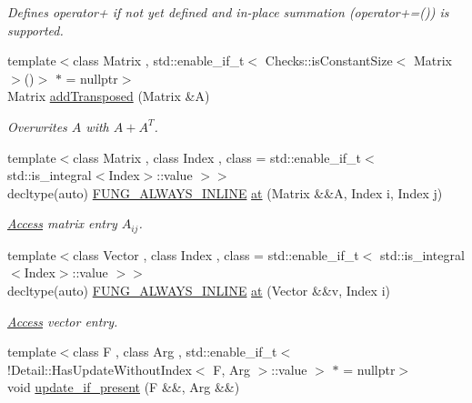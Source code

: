 \begin{DoxyCompactItemize}
\begin{DoxyCompactList}\small\item\em Defines operator+ if not yet defined and in-\/place summation (operator+=()) is supported. \end{DoxyCompactList}\item 
{\footnotesize template$<$class Matrix , std\+::enable\+\_\+if\+\_\+t$<$ Checks\+::is\+Constant\+Size$<$ Matrix $>$()$>$ $\ast$  = nullptr$>$ }\\Matrix \hyperlink{namespaceFunG_a0211d0d26c669d56b5113fd2292902e5}{add\+Transposed} (Matrix \&A)
\begin{DoxyCompactList}\small\item\em Overwrites $A$ with $A+A^T$. \end{DoxyCompactList}\item 
{\footnotesize template$<$class Matrix , class Index , class  = std\+::enable\+\_\+if\+\_\+t$<$ std\+::is\+\_\+integral$<$\+Index$>$\+::value $>$$>$ }\\decltype(auto) \hyperlink{macros_8hh_a03b9da186125795e5afa49d0ef1cc32f}{F\+U\+N\+G\+\_\+\+A\+L\+W\+A\+Y\+S\+\_\+\+I\+N\+L\+I\+NE} \hyperlink{namespaceFunG_aae631e6149505bdfc0b1c6162b370c7f}{at} (Matrix \&\&A, Index i, Index j)
\begin{DoxyCompactList}\small\item\em \hyperlink{namespaceFunG_1_1Access}{Access} matrix entry $A_{ij}$. \end{DoxyCompactList}\item 
{\footnotesize template$<$class Vector , class Index , class  = std\+::enable\+\_\+if\+\_\+t$<$ std\+::is\+\_\+integral$<$\+Index$>$\+::value $>$$>$ }\\decltype(auto) \hyperlink{macros_8hh_a03b9da186125795e5afa49d0ef1cc32f}{F\+U\+N\+G\+\_\+\+A\+L\+W\+A\+Y\+S\+\_\+\+I\+N\+L\+I\+NE} \hyperlink{namespaceFunG_aa40271c9228c5ccee8a4973f27918630}{at} (Vector \&\&v, Index i)
\begin{DoxyCompactList}\small\item\em \hyperlink{namespaceFunG_1_1Access}{Access} vector entry. \end{DoxyCompactList}\item 
{\footnotesize template$<$class F , class Arg , std\+::enable\+\_\+if\+\_\+t$<$!\+Detail\+::\+Has\+Update\+Without\+Index$<$ F, Arg $>$\+::value $>$ $\ast$  = nullptr$>$ }\\void \hyperlink{namespaceFunG_a3b9d2e5d07b30c2ee26703b33e9adb9e}{update\+\_\+if\+\_\+present} (F \&\&, Arg \&\&)
\item 

\end{DoxyCompactItemize}
